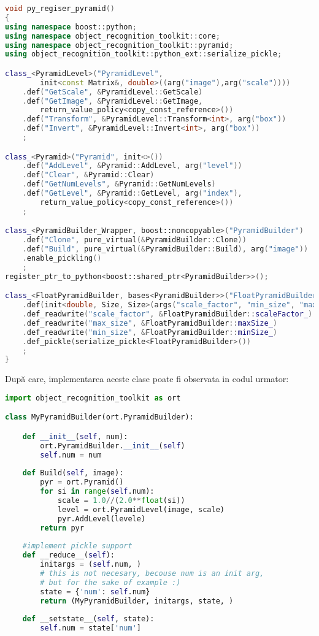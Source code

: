 \begin{lstlisting}[language=C++]
void py_regiser_pyramid()
{
using namespace boost::python;
using namespace object_recognition_toolkit::core;
using namespace object_recognition_toolkit::pyramid;
using object_recognition_toolkit::python_ext::serialize_pickle;

class_<PyramidLevel>("PyramidLevel", 
		init<const Matrix&, double>((arg("image"),arg("scale"))))
	.def("GetScale", &PyramidLevel::GetScale)
	.def("GetImage", &PyramidLevel::GetImage, 
		return_value_policy<copy_const_reference>())
	.def("Transform", &PyramidLevel::Transform<int>, arg("box"))
	.def("Invert", &PyramidLevel::Invert<int>, arg("box"))
	;

class_<Pyramid>("Pyramid", init<>())
	.def("AddLevel", &Pyramid::AddLevel, arg("level"))
	.def("Clear", &Pyramid::Clear)
	.def("GetNumLevels", &Pyramid::GetNumLevels)
	.def("GetLevel", &Pyramid::GetLevel, arg("index"), 
		return_value_policy<copy_const_reference>())
	;

class_<PyramidBuilder_Wrapper, boost::noncopyable>("PyramidBuilder")
	.def("Clone", pure_virtual(&PyramidBuilder::Clone))
	.def("Build", pure_virtual(&PyramidBuilder::Build), arg("image"))
	.enable_pickling()
	;
register_ptr_to_python<boost::shared_ptr<PyramidBuilder>>();

class_<FloatPyramidBuilder, bases<PyramidBuilder>>("FloatPyramidBuilder", init<>())
	.def(init<double, Size, Size>(args("scale_factor", "min_size", "max_size")))
	.def_readwrite("scale_factor", &FloatPyramidBuilder::scaleFactor_)
	.def_readwrite("max_size", &FloatPyramidBuilder::maxSize_)
	.def_readwrite("min_size", &FloatPyramidBuilder::minSize_)
	.def_pickle(serialize_pickle<FloatPyramidBuilder>())
	;
}
\end{lstlisting}

După care, implementarea aceste clase poate fi observata in codul urmator:
\begin{lstlisting}[language=Python,frame=single]
import object_recognition_toolkit as ort

class MyPyramidBuilder(ort.PyramidBuilder):

    def __init__(self, num):
        ort.PyramidBuilder.__init__(self)
        self.num = num
        
    def Build(self, image):
        pyr = ort.Pyramid()
        for si in range(self.num):
        	scale = 1.0//(2.0**float(si))
        	level = ort.PyramidLevel(image, scale)
            pyr.AddLevel(levele)
        return pyr
    
    #implement pickle support
    def __reduce__(self):
        initargs = (self.num, )
        # this is not necesary, becouse num is an init arg, 
        # but for the sake of example :)
        state = {'num': self.num} 
        return (MyPyramidBuilder, initargs, state, )
    
    def __setstate__(self, state):
        self.num = state['num']
\end{lstlisting}